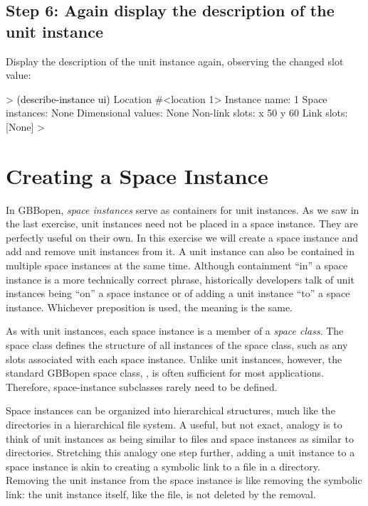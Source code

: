 \documentclass[10pt,twoside,english,pdftex]{article}
\begin{document}
\subsection*{Step 6: Again display the description of the unit instance}

%
Display the description of the  unit instance again, observing the
changed  slot value:
%
\begin{example}\color{darkergray}%
  > \textcolor{black}{(describe-instance ui)}
  Location #<location 1>
    Instance name: 1
    Space instances: None
    Dimensional values: None
    Non-link slots:
      x 50
      y 60
    Link slots:
      [None]
  >
\end{example}


\T\markright{}%
\T\pagestyle{plain}
\T\cleardoublepage
\W{}
\T\pagestyle{fancy}
\T\thispagestyle{fancybottom}
\T\renewcommand{\headrulewidth}{0pt}
\section{Creating a Space Instance}
\label{sec:space-instance}%

In GBBopen, \textit{space instances} serve as containers for unit instances.
As we saw in the last exercise, unit instances need not be placed in a space
instance.  They are perfectly useful on their own.  In this exercise we will
create a space instance and add and remove unit instances from it.  A unit
instance can also be contained in multiple space instances at the same time.
Although containment ``in'' a space instance is a more technically correct
phrase, historically developers talk of unit instances being ``on'' a space
instance or of adding a unit instance ``to'' a space instance.  Whichever
preposition is used, the meaning is the same.

As with unit instances, each space instance is a member of a \textit{space
  class}.  The space class defines the structure of all instances of the space
class, such as any slots associated with each space instance.  Unlike unit
instances, however, the standard GBBopen space class,
, is often sufficient for most applications.
Therefore, space-instance subclasses rarely need to be defined.

Space instances can be organized into hierarchical structures, much like the
directories in a hierarchical file system.  A useful, but not exact, analogy
is to think of unit instances as being similar to files and space instances as
similar to directories.  Stretching this analogy one step further, adding a
unit instance to a space instance is akin to creating a symbolic link to a
file in a directory.  Removing the unit instance from the space instance is
like removing the symbolic link: the unit instance itself, like the file, is
not deleted by the removal.
\end{document}
